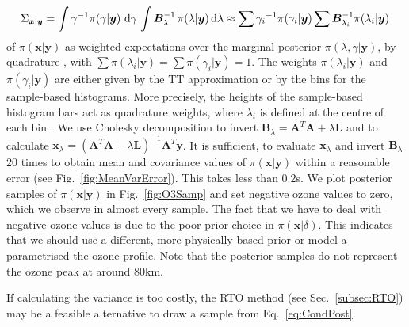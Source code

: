\begin{align}
	\Sigma_{\bm{x}|\bm{y}} = \int \gamma^{-1}  \pi(\gamma | \bm{y} ) \, \mathop{}\!\mathrm{d} \gamma \, \int  \bm{B}_{\lambda}^{-1} \, \pi(\lambda | \bm{y} )  \, \text{d} \lambda  \approx \sum {\gamma_i}^{-1}\pi(\gamma_i| \bm{y}) \sum \bm{B}_{\lambda_i}^{-1}\pi(\lambda_i| \bm{y})\, \label{eq:CovInt}
\end{align}
of $\pi(\bm{x}| \bm{y})$ as weighted expectations over the marginal posterior $\pi(\lambda,\gamma | \bm{y})$, by quadrature \cite[Sec. 2.1]{Dick_Kuo_Sloan_2013}, with $\sum \pi(\lambda_i| \bm{y}) = \sum \pi(\gamma_i| \bm{y}) = 1$.
The weights $\pi(\lambda_i| \bm{y})$ and $\pi(\gamma_i| \bm{y})$ are either given by the TT approximation or by the bins for the sample-based histograms.
More precisely, the heights of the sample-based histogram bars act as quadrature weights, where $\lambda_i$ is defined at the centre of each bin .
We use Cholesky decomposition to invert $\bm{B}_{\lambda} = \bm{A}^T \bm{A} + \lambda \bm{L}$ and to calculate $\bm{x}_{\lambda} = (\bm{A}^T \bm{A} + \lambda \bm{L} )^{-1} \bm{A}^T \bm{y}$.
It is sufficient, to evaluate $\bm{x}_{\lambda}$ and invert $\bm{B}_{\lambda}$ 20 times to obtain mean and covariance values of $\pi(\bm{x}|\bm{y})$ within a reasonable error (see Fig.~\ref{fig:MeanVarError}).
This takes less than $0.2$s.
We plot posterior samples of $\pi(\bm{x}|\bm{y})$ in Fig.~\ref{fig:O3Samp} and set negative ozone values to zero, which we observe in almost every sample.
The fact that we have to deal with negative ozone values is due to the poor prior choice in $\pi(\bm{x}|\delta)$.
This indicates that we should use a different, more physically based prior or model a parametrised the ozone profile.
Note that the posterior samples do not represent the ozone peak at around $80$km.

If calculating the variance is too costly, the RTO method (see Sec.~\ref{subsec:RTO}) may be a feasible alternative to draw a sample from Eq.~\ref{eq:CondPost}.

